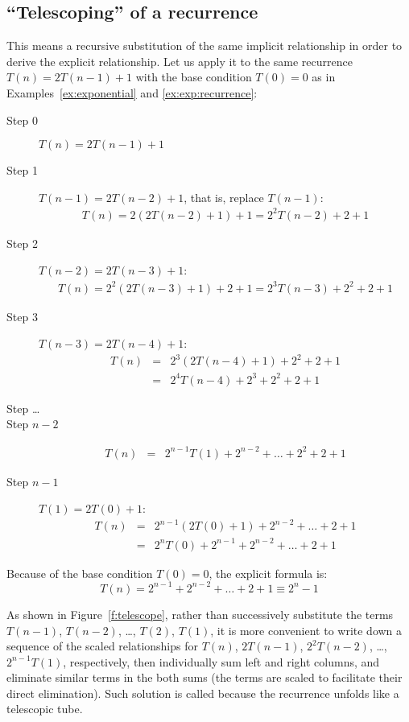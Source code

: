 \subsection{``Telescoping'' of a recurrence}
This means a recursive substitution of the same implicit
relationship in order to derive the explicit relationship. Let us
apply it to the same recurrence \(T(n) = 2T(n-1)+1\) with
the base condition \(T(0) = 0\) as in Examples~\ref{ex:exponential}
and \ref{ex:exp:recurrence}:
\begin{description}
\item[Step 0]  \(T(n) = 2T(n-1)+1\) 
\item[Step 1]  \(T(n-1)=2T(n-2) + 1\), that is,
replace \(T(n-1)\):
\begin{eqnarray*}
   T(n) =  2(2T(n-2) + 1) + 1 =  2^2 T(n-2) + 2 + 1
\end{eqnarray*}
\item[Step 2]  \(T(n-2)=2T(n-3) + 1\):
\begin{eqnarray*}
   T(n) =  2^2 (2T(n-3) + 1) + 2 + 1 
        = 2^3 T(n-3) + 2^2 + 2 + 1
\end{eqnarray*}
\item[Step 3]  \(T(n-3)=2T(n-4) + 1\):
\begin{eqnarray*}
   T(n) & = & 2^3 (2T(n-4) + 1) + 2^2 + 2 + 1 \\
        & = & 2^4 T(n-4) + 2^3 + 2^2 + 2 + 1
\end{eqnarray*}
\item[Step \ldots] \boldfont{\ldots}
\item[Step $n-2$]  \boldfont{\ldots}
\begin{eqnarray*}
   T(n) & = & 2^{n-1}T(1) + 2^{n-2} + \ldots + 2^2 + 2 + 1
\end{eqnarray*}
\item[Step $n-1$]  \(T(1) = 2T(0) + 1\):
\begin{eqnarray*}
   T(n) & = & 2^{n-1} (2T(0) + 1) + 2^{n-2} + \ldots + 2 + 1 \\
        & = & 2^{n}T(0) + 2^{n-1} + 2^{n-2} + \ldots + 2 + 1
\end{eqnarray*}
\end{description} 
Because of the base condition \(T(0)=0\), the explicit formula is:
\[
T(n) = 2^{n-1} + 2^{n-2} + \ldots + 2 + 1 \equiv 2^n - 1
\]

As shown in Figure~\ref{f:telescope}, rather than
successively substitute the terms \(T(n-1)\), \(T(n-2)\),
\ldots, \(T(2)\), \(T(1)\), it is more convenient to write 
down a sequence of
the scaled relationships for \(T(n)\), \(2T(n-1)\), \(2^2 T(n-2)\),
\ldots, \(2^{n-1} T(1)\), respectively, then individually
sum left and right columns, and eliminate
similar terms in the both sums (the terms are scaled to 
facilitate their direct elimination). Such solution is 
called  because the recurrence unfolds
like a telescopic tube. 
 
